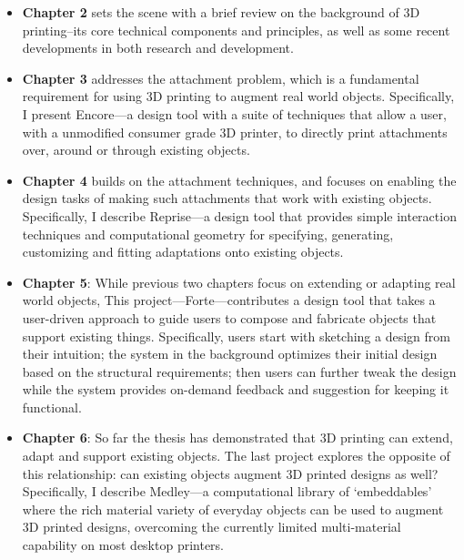 \begin{itemize}
  \item \textbf{Chapter 2} sets the scene with a brief review on the background of 3D printing--its core technical components and principles, as well as some recent developments in both research and development.
  \item \textbf{Chapter 3} addresses the attachment problem, which is a fundamental requirement for using 3D printing to augment real world objects. Specifically, I present Encore---a design tool with a suite of techniques that allow a user, with a unmodified consumer grade 3D printer, to directly print attachments over, around or through existing objects.
  \item \textbf{Chapter 4} builds on the attachment techniques, and focuses on enabling the design tasks of making such attachments that work with existing objects. Specifically, I describe Reprise---a design tool that provides simple interaction techniques and computational geometry for specifying, generating, customizing and fitting adaptations onto existing objects.

  \item \textbf{Chapter 5}: While previous two chapters focus on extending or adapting real world objects, 
  This project---Forte---contributes a design tool that takes a user-driven approach to guide users to compose and fabricate objects that support existing things. Specifically, users start with sketching a design from their intuition; the system in the background optimizes their initial design based on the structural requirements; then users can further tweak the design while the system provides on-demand feedback and suggestion for keeping it functional.

  \item \textbf{Chapter 6}: So far the thesis has demonstrated that 3D printing can extend, adapt and support existing objects. The last project explores the opposite of this relationship: can existing objects augment 3D printed designs as well? Specifically, I describe Medley---a computational library of `embeddables' where the rich material variety of everyday objects can be used to augment 3D printed designs, overcoming the currently limited multi-material capability on most desktop printers.


\end{itemize}
